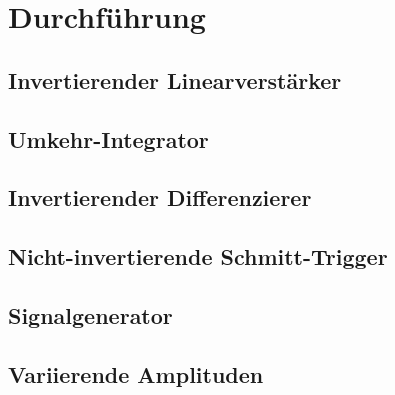 \section{Durchführung}

\subsection{Invertierender Linearverstärker}

\subsection{Umkehr-Integrator}

\subsection{Invertierender Differenzierer}

\subsection{Nicht-invertierende Schmitt-Trigger}

\subsection{Signalgenerator}

\subsection{Variierende Amplituden}

